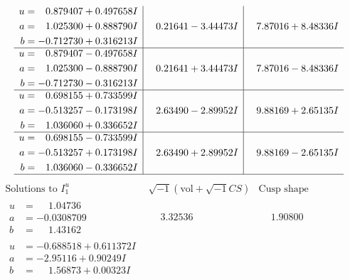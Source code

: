 \documentclass[1p]{elsarticle_modified}
\theoremstyle{definition}
\newcommand{\I}{\sqrt{-1}}
\begin{document}
$$\begin{array}{c|c|c}
\begin{aligned}
u &= \phantom{-}0.879407 + 0.497658 I \\
a &= \phantom{-}1.025300 + 0.888790 I \\
b &= -0.712730 + 0.316213 I\end{aligned}
 & \phantom{-}0.21641 - 3.44473 I & \phantom{-}7.87016 + 8.48336 I \\ \hline\begin{aligned}
u &= \phantom{-}0.879407 - 0.497658 I \\
a &= \phantom{-}1.025300 - 0.888790 I \\
b &= -0.712730 - 0.316213 I\end{aligned}
 & \phantom{-}0.21641 + 3.44473 I & \phantom{-}7.87016 - 8.48336 I \\ \hline\begin{aligned}
u &= \phantom{-}0.698155 + 0.733599 I \\
a &= -0.513257 - 0.173198 I \\
b &= \phantom{-}1.036060 + 0.336652 I\end{aligned}
 & \phantom{-}2.63490 - 2.89952 I & \phantom{-}9.88169 + 2.65135 I \\ \hline\begin{aligned}
u &= \phantom{-}0.698155 - 0.733599 I \\
a &= -0.513257 + 0.173198 I \\
b &= \phantom{-}1.036060 - 0.336652 I\end{aligned}
 & \phantom{-}2.63490 + 2.89952 I & \phantom{-}9.88169 - 2.65135 I\\
 \hline 
 \end{array}$$\newpage$$\begin{array}{c|c|c}  
\text{Solutions to }I^u_{1}& \I (\text{vol} + \sqrt{-1}CS) & \text{Cusp shape}\\
 \hline 
\begin{aligned}
u &= \phantom{-}1.04736\phantom{ +0.000000I} \\
a &= -0.0308709\phantom{ +0.000000I} \\
b &= \phantom{-}1.43162\phantom{ +0.000000I}\end{aligned}
 & \phantom{-}3.32536\phantom{ +0.000000I} & \phantom{-}1.90800\phantom{ +0.000000I} \\ \hline\begin{aligned}
u &= -0.688518 + 0.611372 I \\
a &= -2.95116 + 0.90249 I \\
b &= \phantom{-}1.56873 + 0.00323 I\end{aligned}

\end{array}$$
\end{document}
